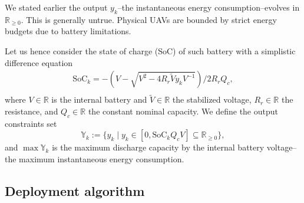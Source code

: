 \documentclass[letterpaper,10pt,conference]{ieeeconf}
\theoremstyle{definition}
\begin{document}
We stated earlier the output $y_k$--the instantaneous energy consumption--evolves in $\mathbb{R}_{\geq 0}$. This is generally untrue. Physical UAVs are bounded by strict energy budgets due to battery limitations.

Let us hence consider the state of charge (SoC) of such battery with a simplistic difference equation~\cite{seewald2020mechanical}
\begin{equation}\begin{split}
  \mathrm{SoC}_k=-\left(V-
  \sqrt{
    V^2-
    4R_r\tilde{V}y_kV^{-1}}
  \right)/2R_rQ_c,\\ 
\end{split}\end{equation}
where $V\in\mathbb{R}$ is the internal battery and $\tilde{V}\in\mathbb{R}$ the stabilized voltage, $R_r\in\mathbb{R}$ the resistance, and $Q_c\in\mathbb{R}$ the constant nominal capacity. We define the output constraints set
\begin{equation}
  \mathbb{Y}_k:=\{y_k\mid y_k\in[0,\mathrm{SoC}_kQ_cV]\subseteq{\mathbb{R}_{\geq 0}}\},
\end{equation}
and $\max{\mathbb{Y}}_k$ is the maximum discharge capacity by the internal battery voltage--the maximum instantaneous energy consumption.

\subsection{Deployment algorithm}
\end{document}
